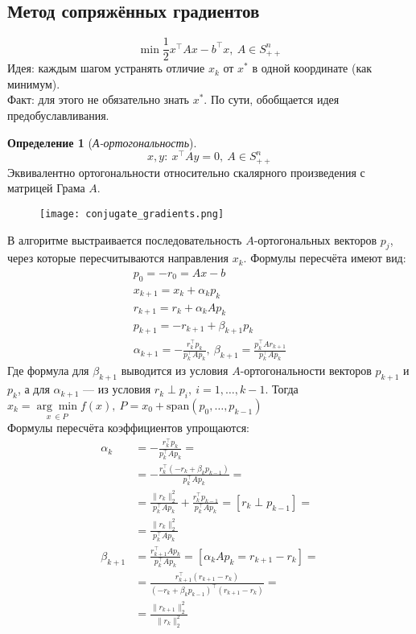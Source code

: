 \documentclass[11pt,a4paper]{report}
\theoremstyle{definition}
\theoremstyle{definition}
\theoremstyle{definition}
\newtheorem*{definition}{Определение}
\begin{document}
	\subsection{Метод сопряжённых градиентов}
	$$
		\min \frac{1}{2} x^{\top} A x - b^{\top} x,\ A \in S^{n}_{++}
	$$
	Идея: каждым шагом устранять отличие $ x_k $ от $ x^* $ в одной координате (как минимум).\\
	Факт: для этого не обязательно знать $ x^* $. По сути, обобщается идея предобуславливания.\\
	\begin{definition}[\textit{А-ортогональность}]
		$$  
			x, y:\ x^{\top} A y = 0,\ A \in S^{n}_{++}
		$$
		Эквивалентно ортогональности относительно скалярного произведения с матрицей Грама $ A $.
	\end{definition}
	\begin{figure}[H]
		\texttt{[image: conjugate\_gradients.png]}
	\end{figure}
	\noindent В алгоритме выстраивается последовательность $ A $-ортогональных векторов $ p_j $, через которые пересчитываются направления $ x_k $. Формулы пересчёта имеют вид:
	\begin{gather*}
		p_{0} = -r_{0} = Ax - b\\
		x_{k+1} = x_{k} + \alpha_k p_{k} \\
		r_{k+1} = r_{k} + \alpha_k A p_k\\ 
		p_{k+1} = -r_{k+1} + \beta_{k+1} p_{k} \\
		\alpha_{k+1} = -\frac{r_{k}^{\top}p_k}{p_k^{\top} A p_k},\ \beta_{k+1} = \frac{p_k^{\top} A r_{k+1}}{p_{k}^{\top} A p_{k}}
	\end{gather*}
	Где формула для $ \beta_{k+1} $ выводится из условия $A$-ортогональности векторов $ p_{k+1} $ и $ p_{k} $, а для $ \alpha_{k+1} $ — из условия $ r_{k} \perp p_{i},\ i = 1,\ldots,k-1 $. Тогда $ x_{k} = \underset{x\ \in P}{\arg\min} f(x),\ P = x_{0} + \mathrm{span} (p_0, \ldots, p_{k-1})$\\
	Формулы пересчёта коэффициентов упрощаются:
	\begin{align*}
		\alpha_k &= -\frac{r_{k}^{\top} p_k}{p_k^{\top} A p_k} =\\
		&= -\frac{r_{k}^{\top} (-r_k + \beta_k p_{k-1})}{p_k^{\top} A p_k}=\\
		&= \frac{\| r_k \|_2^2}{p_k^{\top} A p_k} + \frac{r_k^{\top} p_{k-1}}{p_k^{\top} A p_k}= [r_k \perp p_{k-1}] =\\
		&= \frac{\| r_k \|_2^2}{p_k^{\top} A p_k}\\
		\beta_{k+1} &= \frac{r_{k+1}^{\top} A p_k}{p_k^{\top} A p_{k}} = [\alpha_k A p_k = r_{k+1} - r_{k}] =\\
		&= \frac{r_{k+1}^{\top} (r_{k+1} - r_{k})}{(-r_{k} + \beta_k p_{k-1})^{\top} (r_{k+1} - r_{k})} =\\
		&= \frac{\| r_{k+1} \|_2^2}{\| r_{k} \|_2^2}
	\end{align*}
\end{document}

